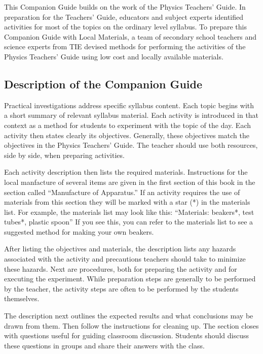 This Companion Guide builds on the work of the Physics Teachers' Guide. In preparation for the Teachers' Guide, educators and subject experts identified activities for most of the topics on the ordinary level syllabus. To prepare this Companion Guide with Local Materials, a team of secondary school teachers and science experts from TIE devised methods for performing the activities of the Physics Teachers' Guide using low cost and locally available materials.

\subsection*{Description of the Companion Guide}

Practical investigations address specific syllabus content. Each topic begins with a short summary of relevant syllabus material. Each activity is introduced in that context as a method for students to experiment with the topic of the day. Each activity then states clearly its objectives. Generally, these objectives match the objectives in the Physics Teachers' Guide. The teacher should use both resources, side by side, when preparing activities.

Each activity description then lists the required materials. Instructions for the local manfacture of several items are given in the first section of this book in the section called ``Manufacture of Apparatus.'' If an activity requires the use of materials from this section they will be marked with a star (*) in the materials list. For example, the materials list may look like this:
``Materials: beakers*, test tubes*, plastic spoon''
If you see this, you can refer to the materials list to see a suggested method for making your own beakers.

After listing the objectives and materials, the description lists any hazards associated with the activity and precautions teachers should take to minimize these hazards. Next are procedures, both for preparing the activity and for executing the experiment. While preparation steps are generally to be performed by the teacher, the activity steps are often to be performed by the students themselves.

The description next outlines the expected results and what conclusions may be drawn from them. Then follow the instructions for cleaning up. The section closes with questions useful for guiding classroom discussion. Students should discuss these questions in groups and share their answers with the class.

